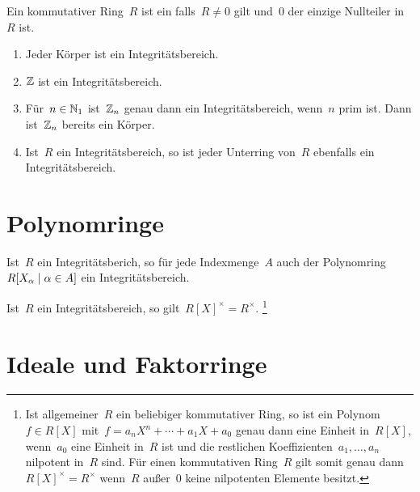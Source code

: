 \begin{definition}
  Ein kommutativer Ring~$R$ ist ein  falls~$R \neq 0$ gilt und~$0$ der einzige Nullteiler in~$R$ ist.
\end{definition}

\begin{example}
  \leavevmode
  \begin{enumerate}
    \item
      Jeder Körper ist ein Integritätsbereich.
    \item
      $\mathbb{Z}$ ist ein Integritätsbereich.
    \item
      Für~$n \in \mathbb{N}_1$ ist~$\mathbb{Z}_n$ genau dann ein Integritätsbereich, wenn~$n$ prim ist.
      Dann ist~$\mathbb{Z}_n$ bereits ein Körper.
    \item
      Ist~$R$ ein Integritätsbereich, so ist jeder Unterring von~$R$ ebenfalls ein Integritätsbereich.
  \end{enumerate}
\end{example}





\section{Polynomringe}

\begin{proposition}
  Ist~$R$ ein Integritätsberich, so für jede Indexmenge~$A$ auch der Polynomring~$R[X_\alpha \suchthat \alpha \in A]$ ein Integritätsbereich.
\end{proposition}

\begin{proposition}
  Ist~$R$ ein Integritätsbereich, so gilt~$R[X]^\times = R^\times$.%
  \footnote{
    Ist allgemeiner~$R$ ein beliebiger kommutativer Ring, so ist ein Polynom~$f \in R[X]$ mit~$f = a_n X^n + \dotsb + a_1 X + a_0$ genau dann eine Einheit in~$R[X]$, wenn~$a_0$ eine Einheit in~$R$ ist und die restlichen Koeffizienten~$a_1, \dotsc, a_n$ nilpotent in~$R$ sind.
    Für einen kommutativen Ring~$R$ gilt somit genau dann~$R[X]^\times = R^\times$ wenn~$R$ außer~$0$ keine nilpotenten Elemente besitzt.
  }
  
\end{proposition}





\section{Ideale und Faktorringe}




